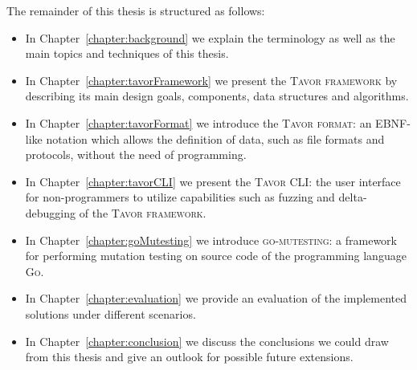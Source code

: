 The remainder of this thesis is structured as follows:

\begin{itemize}
\item In Chapter~\ref{chapter:background} we explain the terminology as well as the main topics and techniques of this thesis.
\item In Chapter~\ref{chapter:tavorFramework} we present the \textsc{Tavor framework} by describing its main design goals, components, data structures and algorithms.
\item In Chapter~\ref{chapter:tavorFormat} we introduce the \textsc{Tavor format}: an EBNF-like notation which allows the definition of data, such as file formats and protocols, without the need of programming.
\item In Chapter~\ref{chapter:tavorCLI} we present the \textsc{Tavor CLI}: the user interface for non-programmers to utilize capabilities such as fuzzing and delta-debugging of the \textsc{Tavor framework}.
\item In Chapter~\ref{chapter:goMutesting} we introduce \textsc{go-mutesting}: a framework for performing mutation testing on source code of the programming language \textsc{Go}.
\item In Chapter~\ref{chapter:evaluation} we provide an evaluation of the implemented solutions under different scenarios.
\item In Chapter~\ref{chapter:conclusion} we discuss the conclusions we could draw from this thesis and give an outlook for possible future extensions.
\end{itemize}
